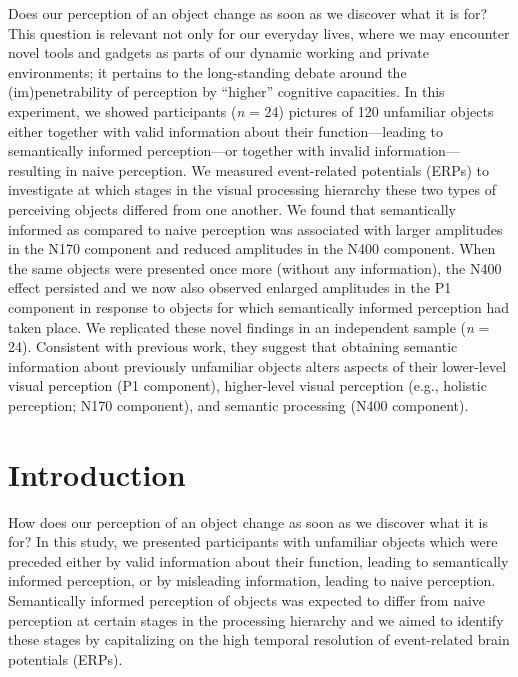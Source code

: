 \documentclass[
  english,
  doc,12pt,twoside,floatsintext]{apa7}
\begin{document}
Does our perception of an object change as soon as we discover what it is for? This question is relevant not only for our everyday lives, where we may encounter novel tools and gadgets as parts of our dynamic working and private environments; it pertains to the long-standing debate around the (im)penetrability of perception by ``higher'' cognitive capacities. In this experiment, we showed participants (\emph{n} = 24) pictures of 120 unfamiliar objects either together with valid information about their function---leading to semantically informed perception---or together with invalid information---resulting in naive perception. We measured event-related potentials (ERPs) to investigate at which stages in the visual processing hierarchy these two types of perceiving objects differed from one another. We found that semantically informed as compared to naive perception was associated with larger amplitudes in the N170 component and reduced amplitudes in the N400 component. When the same objects were presented once more (without any information), the N400 effect persisted and we now also observed enlarged amplitudes in the P1 component in response to objects for which semantically informed perception had taken place. We replicated these novel findings in an independent sample (\emph{n} = 24). Consistent with previous work, they suggest that obtaining semantic information about previously unfamiliar objects alters aspects of their lower-level visual perception (P1 component), higher-level visual perception (e.g., holistic perception; N170 component), and semantic processing (N400 component).

\newpage

\hypertarget{introduction}{%
\section{Introduction}\label{introduction}}

How does our perception of an object change as soon as we discover what it is for? In this study, we presented participants with unfamiliar objects which were preceded either by valid information about their function, leading to semantically informed perception, or by misleading information, leading to naive perception. Semantically informed perception of objects was expected to differ from naive perception at certain stages in the processing hierarchy and we aimed to identify these stages by capitalizing on the high temporal resolution of event-related brain potentials (ERPs).
\end{document}
